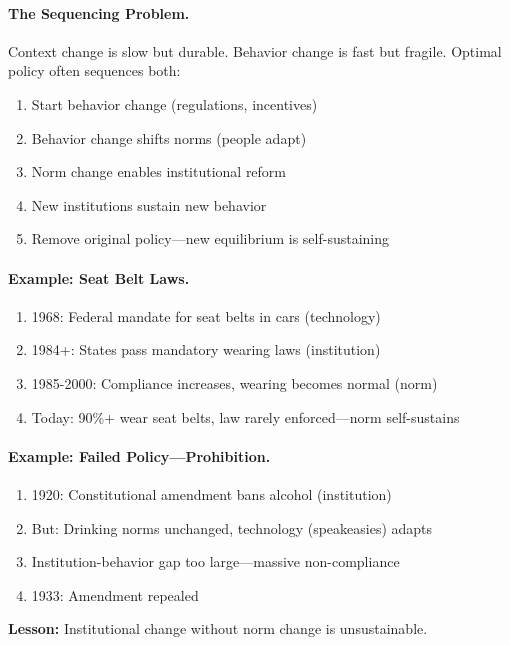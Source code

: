\documentclass[12pt,a4paper]{article}
\begin{document}
\paragraph{The Sequencing Problem.}
Context change is slow but durable. Behavior change is fast but fragile.
Optimal policy often sequences both:
\begin{enumerate}
  \item Start behavior change (regulations, incentives)
  \item Behavior change shifts norms (people adapt)
  \item Norm change enables institutional reform
  \item New institutions sustain new behavior
  \item Remove original policy---new equilibrium is self-sustaining
\end{enumerate}

\paragraph{Example: Seat Belt Laws.}
\begin{enumerate}
  \item 1968: Federal mandate for seat belts in cars (technology)
  \item 1984+: States pass mandatory wearing laws (institution)
  \item 1985-2000: Compliance increases, wearing becomes normal (norm)
  \item Today: 90\%+ wear seat belts, law rarely enforced---norm self-sustains
\end{enumerate}

\paragraph{Example: Failed Policy---Prohibition.}
\begin{enumerate}
  \item 1920: Constitutional amendment bans alcohol (institution)
  \item But: Drinking norms unchanged, technology (speakeasies) adapts
  \item Institution-behavior gap too large---massive non-compliance
  \item 1933: Amendment repealed
\end{enumerate}

\textbf{Lesson:} Institutional change without norm change is unsustainable.
\end{document}
